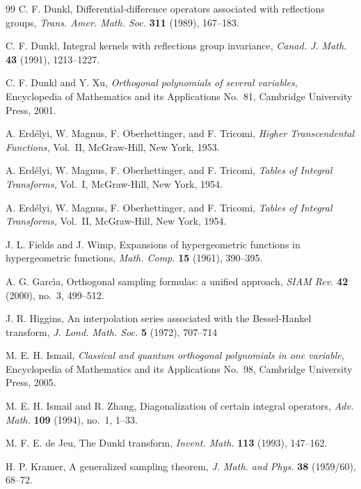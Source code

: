 \documentclass[11pt,a4paper]{amsart}
\theoremstyle{plain}
\theoremstyle{definition}
\begin{document}
\begin{thebibliography}{99}
 C. F. Dunkl, {Differential-difference operators associated
with reflections groups,} \textit{Trans. Amer. Math. Soc.} \textbf{311}
(1989), 167--183.

 C. F. Dunkl, {Integral kernels with reflections group
invariance,} \textit{Canad. J. Math.} \textbf{43} (1991), 1213--1227.

 C. F. Dunkl and Y. Xu,
\textit{Orthogonal polynomials of several variables},
Encyclopedia of Mathematics and its Applications No.~81,
Cambridge University Press, 2001.

 A. Erd\'elyi, W. Magnus, F. Oberhettinger, and F. Tricomi,
\textit{Higher Transcendental Functions,}
Vol.~II, McGraw-Hill, New York, 1953.

 A. Erd\'{e}lyi, W. Magnus, F. Oberhettinger, and F. Tricomi,
\textit{Tables of Integral Transforms,} Vol.~I, McGraw-Hill, New
York, 1954.

 A. Erd\'{e}lyi, W. Magnus, F. Oberhettinger, and F. Tricomi,
\textit{Tables of Integral Transforms,} Vol.~II, McGraw-Hill, New
York, 1954.

 J. L. Fields and J. Wimp, 
{Expansions of hypergeometric functions in hypergeometric functions}, 
\textit{Math. Comp.} \textbf{15} (1961), 390--395.

 A. G. Garc\'{\i}a, {Orthogonal sampling formulas: a unified
approach}, \textit{SIAM Rev.} \textbf{42} (2000), no.~3, 499--512.


 J. R. Higgins, {An interpolation series associated
with the Bessel-Hankel transform}, \textit{J. Lond. Math. Soc.} \textbf{5} (1972),
707--714

 M. E. H. Ismail, \textit{Classical and
quantum orthogonal polynomials in one variable},
Encyclopedia of Mathematics and its Applications No.~98,
Cambridge University Press, 2005.

 M. E. H. Ismail and R. Zhang, {Diagonalization of certain
integral operators}, \textit{Adv. Math.} \textbf{109} (1994), no.~1, 1--33.

 M. F. E. de Jeu, {The Dunkl transform}, \textit{Invent. Math.}
\textbf{113} (1993), 147--162.

 H. P. Kramer, {A generalized sampling theorem},
\textit{J. Math. and Phys.} \textbf{38} (1959/60), 68--72.


\end{thebibliography}
\end{document}
